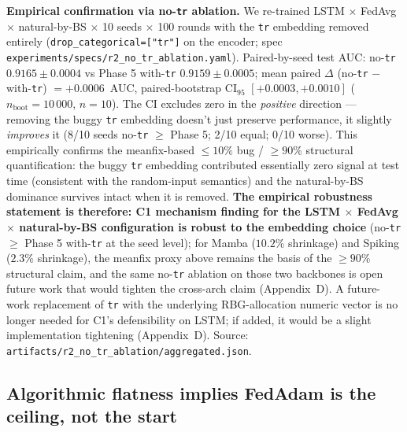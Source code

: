 \documentclass[journal]{IEEEtran}
\begin{document}
\textbf{Empirical confirmation via no-\lstinline|tr| ablation.} We re-trained LSTM $\times$ FedAvg $\times$ natural-by-BS $\times$ 10 seeds $\times$ 100 rounds with the \lstinline|tr| embedding removed entirely (\lstinline|drop_categorical=["tr"]| on the encoder; spec \lstinline|experiments/specs/r2_no_tr_ablation.yaml|). Paired-by-seed test AUC: no-\lstinline|tr| $0.9165 \pm 0.0004$ vs Phase 5 with-\lstinline|tr| $0.9159 \pm 0.0005$; mean paired $\Delta$ (no-\lstinline|tr| $-$ with-\lstinline|tr|) $= \mathbf{+0.0006}$~AUC, paired-bootstrap CI$_{95}$ $\mathbf{[+0.0003, +0.0010]}$ ($n_{\mathrm{boot}}=10\,000$, $n=10$). The CI excludes zero in the \emph{positive} direction --- removing the buggy \lstinline|tr| embedding doesn't just preserve performance, it slightly \emph{improves} it (8/10 seeds no-\lstinline|tr| $\geq$ Phase 5; 2/10 equal; 0/10 worse). This empirically confirms the meanfix-based $\leq 10\%$ bug / $\geq 90\%$ structural quantification: the buggy \lstinline|tr| embedding contributed essentially zero signal at test time (consistent with the random-input semantics) and the natural-by-BS dominance survives intact when it is removed. \textbf{The empirical robustness statement is therefore: C1 mechanism finding for the LSTM $\times$ FedAvg $\times$ natural-by-BS configuration is robust to the embedding choice} (no-\lstinline|tr| $\geq$ Phase 5 with-\lstinline|tr| at the seed level); for Mamba ($10.2\%$ shrinkage) and Spiking ($2.3\%$ shrinkage), the meanfix proxy above remains the basis of the $\geq 90\%$ structural claim, and the same no-\lstinline|tr| ablation on those two backbones is open future work that would tighten the cross-arch claim (Appendix~D). A future-work replacement of \lstinline|tr| with the underlying RBG-allocation numeric vector is no longer needed for C1's defensibility on LSTM; if added, it would be a slight implementation tightening (Appendix~D). Source: \lstinline|artifacts/r2_no_tr_ablation/aggregated.json|.

\subsection{Algorithmic flatness implies FedAdam is the ceiling, not the start}\label{sec:why-fedadam-saturates}
\end{document}
